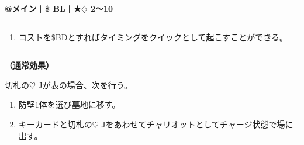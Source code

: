 \documentclass[twocolumn,a5paper,papersize,10pt]{jarticle}
\begin{document}
\begin{tcolorbox}[title={\small\bf【Action】チャリオット召喚}{\scriptsize （召喚）}]

{\scriptsize\bf @メイン }
  {\scriptsize\bf | \$ BL }
  {\scriptsize\bf | ★{\normalsize $\diamondsuit$} 2〜10}

\vspace{1mm} %
\hrule height 0.1mm depth 0mm width 62mm %
\vspace{1mm} %


\vspace{-1zh}%
\begin{enumerate}
\renewcommand{\labelenumi}{※}
\setlength{\leftskip}{-0.3cm}
\setlength{\itemsep}{0pt} %
\setlength{\parskip}{0pt} %

\item コストを\$BDとすればタイミングをクイックとして起こすことができる。

\vspace{-3mm}%
\end{enumerate}
\vspace{-2mm} %
\vspace{1zh}%
\vspace{1mm} %
\hrule height 0.1mm depth 0mm width 62mm %
\vspace{1mm} %

{\bf（通常効果）}

切札の{\normalsize $\heartsuit$} Jが表の場合、次を行う。


\vspace{-1zh}%
\begin{enumerate}
\setlength{\leftskip}{-0.3cm}
\setlength{\parskip}{0pt} %

\item 防壁1体を選び墓地に移す。

\item キーカードと切札の{\normalsize $\heartsuit$} Jをあわせてチャリオットとしてチャージ状態で場に出す。
\vspace{-1zh}%
\end{enumerate}

\vspace{1mm} %
\end{tcolorbox}

\vspace{-1zh}
  
\end{document}

